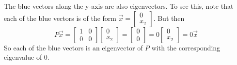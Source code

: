 \documentclass{ximera}
\begin{document}
\begin{example}
\begin{explanation}
\begin{center}
\end{center}

The blue vectors along the y-axis are also eigenvectors.  To see this, note that each of the blue vectors is of the form $\vec{x}=\begin{bmatrix}0\\x_2\end{bmatrix}$.  But then $$P\vec{x}=\begin{bmatrix}1&0\\0&0\end{bmatrix}\begin{bmatrix}0\\x_2\end{bmatrix}=\begin{bmatrix}0\\0\end{bmatrix}=0\begin{bmatrix}0\\x_2\end{bmatrix}=0\vec{x}$$
So each of the blue vectors is an eigenvector of $P$ with the corresponding eigenvalue of $0$.
\end{explanation}
\end{example}
\end{document}

